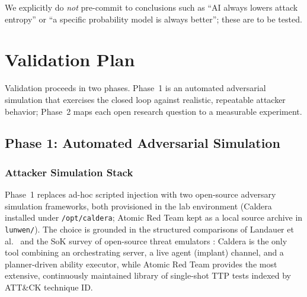 \documentclass[preprints,article,accept,oneauthor]{Definitions/mdpi}
\begin{document}
We explicitly do \textit{not} pre-commit to conclusions such as ``AI always
lowers attack entropy'' or ``a specific probability model is always
better''; these are to be tested.

\section{Validation Plan}
\label{sec:validation}

Validation proceeds in two phases. Phase~1 is an automated adversarial
simulation that exercises the closed loop against realistic, repeatable
attacker behavior; Phase~2 maps each open research question to a measurable
experiment.

\subsection{Phase 1: Automated Adversarial Simulation}
\label{sec:experiment}

\subsubsection{Attacker Simulation Stack}

Phase~1 replaces ad-hoc scripted injection with two open-source adversary
simulation frameworks, both provisioned in the lab environment (Caldera
installed under \texttt{/opt/caldera}; Atomic Red Team kept as a local source
archive in \texttt{lunwen/}). The choice is grounded in the structured
comparisons of
Landauer et al.\ \citep{red-team-redemption} and the SoK survey of
open-source threat emulators \citep{sok-threat-emulators}: Caldera is the
only tool combining an orchestrating server, a live agent (implant)
channel, and a planner-driven ability executor, while Atomic Red Team
provides the most extensive, continuously maintained library of single-shot
TTP tests indexed by ATT\&CK technique ID.
\end{document}
